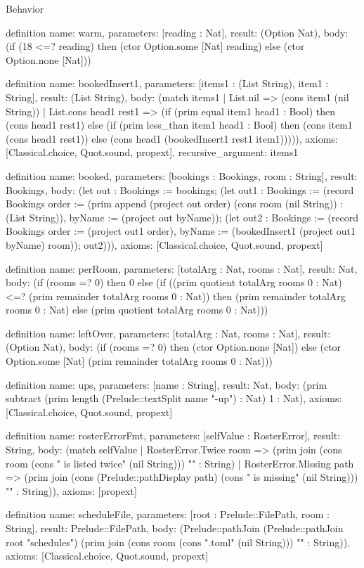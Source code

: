 \begin{lexlean}{Behavior}
\begin{semanticmodule}
definition{
  name: warm,
  parameters: [reading : Nat],
  result: (Option Nat),
  body: (if (18 <=? reading) then (ctor Option.some [Nat] reading) else (ctor Option.none [Nat]))
}

definition{
  name: bookedInsert1,
  parameters: [items1 : (List String), item1 : String],
  result: (List String),
  body: (match items1
    | List.nil => (cons item1 (nil String))
    | List.cons head1 rest1 => (if (prim equal item1 head1 : Bool) then (cons head1 rest1) else (if (prim less_than item1 head1 : Bool) then (cons item1 (cons head1 rest1)) else (cons head1 (bookedInsert1 rest1 item1))))),
  axioms: [Classical.choice, Quot.sound, propext],
  recursive_argument: items1
}

definition{
  name: booked,
  parameters: [bookings : Bookings, room : String],
  result: Bookings,
  body: (let out : Bookings := bookings; (let out1 : Bookings := (record Bookings {order := (prim append (project out order) (cons room (nil String)) : (List String)), byName := (project out byName)}); (let out2 : Bookings := (record Bookings {order := (project out1 order), byName := (bookedInsert1 (project out1 byName) room)}); out2))),
  axioms: [Classical.choice, Quot.sound, propext]
}

definition{
  name: perRoom,
  parameters: [totalArg : Nat, rooms : Nat],
  result: Nat,
  body: (if (rooms =? 0) then 0 else (if ((prim quotient totalArg rooms 0 : Nat) <=? (prim remainder totalArg rooms 0 : Nat)) then (prim remainder totalArg rooms 0 : Nat) else (prim quotient totalArg rooms 0 : Nat)))
}

definition{
  name: leftOver,
  parameters: [totalArg : Nat, rooms : Nat],
  result: (Option Nat),
  body: (if (rooms =? 0) then (ctor Option.none [Nat]) else (ctor Option.some [Nat] (prim remainder totalArg rooms 0 : Nat)))
}

definition{
  name: ups,
  parameters: [name : String],
  result: Nat,
  body: (prim subtract (prim length (Prelude::textSplit name "-up") : Nat) 1 : Nat),
  axioms: [Classical.choice, Quot.sound, propext]
}

definition{
  name: rosterErrorFmt,
  parameters: [selfValue : RosterError],
  result: String,
  body: (match selfValue
    | RosterError.Twice room => (prim join (cons room (cons " is listed twice" (nil String))) "" : String)
    | RosterError.Missing path => (prim join (cons (Prelude::pathDisplay path) (cons " is missing" (nil String))) "" : String)),
  axioms: [propext]
}

definition{
  name: scheduleFile,
  parameters: [root : Prelude::FilePath, room : String],
  result: Prelude::FilePath,
  body: (Prelude::pathJoin (Prelude::pathJoin root "schedules") (prim join (cons room (cons ".toml" (nil String))) "" : String)),
  axioms: [Classical.choice, Quot.sound, propext]
}


\end{semanticmodule}
\end{lexlean}
